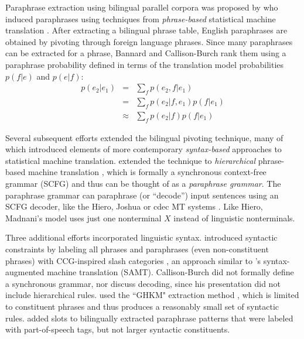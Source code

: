 \documentclass[11pt]{article}
\begin{document}
Paraphrase extraction using bilingual parallel corpora was proposed by
 who induced paraphrases using techniques
from {\it phrase-based} statistical machine translation
\cite{Koehn2003}. After extracting a bilingual phrase table, English
paraphrases are obtained by pivoting through foreign language
phrases.
Since many paraphrases can be extracted for a phrase, Bannard and
Callison-Burch rank them using a paraphrase probability defined in
terms of the translation model probabilities $p(f | e)$ and $p(e |
f)$: \nocite{Callison-Burch2005}
\begin{eqnarray}
  p(e_2|e_1) &=& \sum_f p(e_2,f|e_1)\\
                  &=& \sum_f p(e_2|f,e_1) p(f|e_1) \\
                  &\approx& \sum_f p(e_2|f) p(f|e_1)
\label{paraphrase_prob_eqn}
\end{eqnarray}

Several subsequent efforts extended the bilingual pivoting technique,
many of which introduced elements of more contemporary {\it
  syntax-based} approaches to statistical machine translation.
 extended the technique to {\it hierarchical}
phrase-based machine translation \cite{Chiang2005}, which is formally
a synchronous context-free grammar (SCFG) and thus can be thought of
as a {\it paraphrase grammar}. The paraphrase grammar can paraphrase
(or ``decode'') input sentences using an SCFG decoder, like the Hiero,
Joshua or cdec MT systems \cite{Chiang2007,Joshua-WMT,Dyer_etal_2010}.
Like Hiero, Madnani's model uses just one nonterminal
$X$ instead of linguistic nonterminals.


Three additional efforts incorporated linguistic
syntax.  introduced syntactic constraints
by labeling all phrases and paraphrases (even non-constituent phrases)
with CCG-inspired slash categories \cite{Steedman2011}, an approach similar to
's syntax-augmented machine translation
(SAMT). Callison-Burch did not formally define a synchronous grammar,
nor discuss decoding, since his presentation did not include
hierarchical rules.   used the ``GHKM"
extraction method \cite{Galley2004}, which is limited to constituent
phrases and thus produces a reasonably small set of syntactic rules.
 added slots to bilingually extracted paraphrase
patterns that were labeled with part-of-speech tags, but not larger
syntactic constituents.
\end{document}
